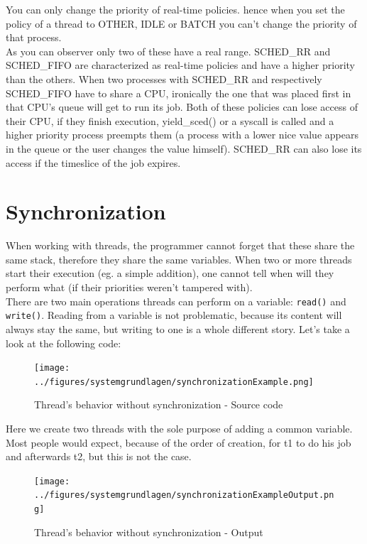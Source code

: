 You can only change the priority of real-time policies. hence when you set the policy of a thread to OTHER, IDLE or BATCH you can't change the priority of that process.\\
As you can observer only two of these have a \dq real\dq{} range.
SCHED\_RR and SCHED\_FIFO are characterized as real-time policies and have a higher priority than the
others. When two processes with SCHED\_RR and respectively SCHED\_FIFO have to share a CPU,
ironically the one that was placed first in that CPU's queue will get to run its job. Both of these
policies can lose access of their CPU, if they finish execution, yield\_sced() or a syscall is called
and a higher priority process preempts them (a process with a lower nice value appears in the queue
or the user changes the value himself). SCHED\_RR can also lose its access if the timeslice of
the job expires.

\section{Synchronization}
When working with threads, the programmer cannot forget that these share the same stack, therefore they share the same variables. When two or more threads start their execution (eg. a simple addition), one cannot tell when will they perform what (if their priorities weren't tampered with).\\
There are two main operations threads can perform on a variable: \texttt{read()} and \texttt{write()}. Reading from a variable is not problematic, because its content will always stay the same, but writing to one is a whole different story. Let's take a look at the following code:
\begin{figure}[!htb]
	\centering
	\texttt{[image: ../figures/systemgrundlagen/synchronizationExample.png]}
	\caption{Thread's behavior without synchronization - Source code}
\end{figure}
Here we create two threads with the sole purpose of adding a common variable. Most people would expect, because of the order of creation, for t1 to do his job and afterwards t2, but this is not the case.
\newpage
\begin{figure}
	\centering
	\texttt{[image: ../figures/systemgrundlagen/synchronizationExampleOutput.png]}
	\caption{Thread's behavior without synchronization - Output}
\end{figure}

